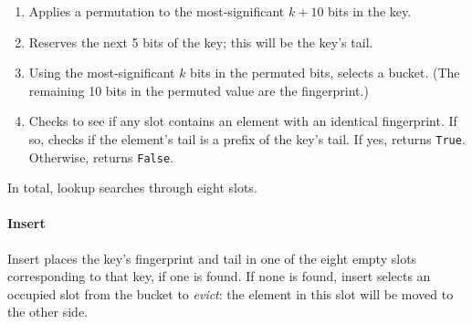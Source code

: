 \documentclass[letterpaper,twocolumn,10pt]{article}
\begin{document}
\begin{enumerate}
\item Applies a permutation to the most-significant $k+10$ bits in the key. %
\item Reserves the next 5 bits of the key; this will be the key's tail.
\item Using the most-significant $k$ bits in the permuted bits, selects a bucket. %
(The remaining 10 bits in the permuted value are the fingerprint.)
\item Checks to see if any slot contains an element with an identical fingerprint. %
If so, checks if the element's tail is a prefix of the key's tail.
If yes, returns \verb|True|.
Otherwise, returns \verb|False|.
\end{enumerate}




In total, lookup searches through eight slots.

\paragraph{Insert}
Insert places the key's fingerprint and tail in one of the eight empty slots corresponding to that key, if one is found.
If none is found, insert selects an occupied slot from the bucket to {\em evict}: the element in this slot will be moved to the other side. %
\end{document}
